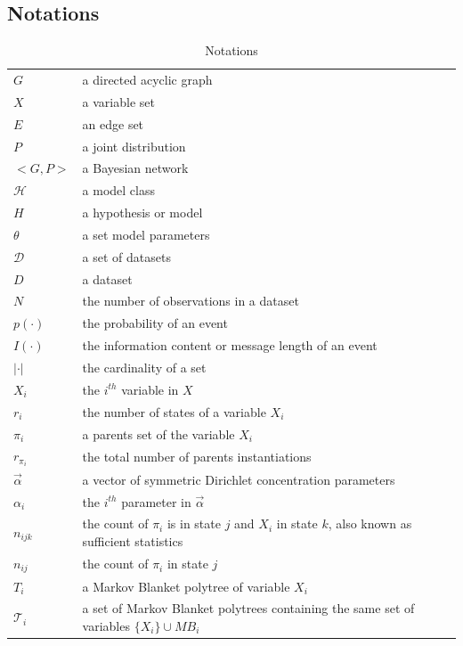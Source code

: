 \documentclass{svmult}
\begin{document}
\newpage
\subsection{Notations}
\begin{table}[]
\centering
\caption{Notations}
\label{my-label}
\begin{tabular}{ll}
\hline
$G$ &  a directed acyclic graph\\
$X$ & a variable set \\ 
$E$ & an edge set \\
$P$ & a joint distribution \\
$<G, P>$ & a Bayesian network \\
$\mathcal{H}$ & a model class \\
$H$ & a hypothesis or model \\
$\theta$ &  a set model parameters\\
$\mathcal{D}$ & a set of datasets \\
$D$ & a dataset \\ 
$N$ & the number of observations in a dataset \\
$p(\cdot)$ & the probability of an event \\
$I(\cdot)$ & the information content or message length of an event\\
$|\cdot|$ & the cardinality of a set \\
$X_i$ & the $i^{th}$ variable in $X$ \\ 
$r_i$ & the number of states of a variable $X_i$ \\ 
$\pi_i$ & a parents set of the variable $X_i$ \\ 
$r_{\pi_i}$ & the total number of parents instantiations\\
$\vec{\alpha}$ & a vector of symmetric Dirichlet concentration parameters \\ 
$\alpha_i$ & the $i^{th}$ parameter in $\vec{\alpha}$ \\ 
$n_{ijk}$ & the count of $\pi_i$ is in state $j$ and $X_i$ in state $k$, also known as sufficient statistics\\ 
$n_{ij}$ & the count of $\pi_i$ in state $j$ \\ 
$T_i$ & a Markov Blanket polytree of variable $X_i$ \\
$\mathcal{T}_i$ & a set of Markov Blanket polytrees containing the same set of variables $\{X_i\}\cup MB_i$ \\ \hline
\end{tabular}
\end{table}


\newpage


\end{document}
